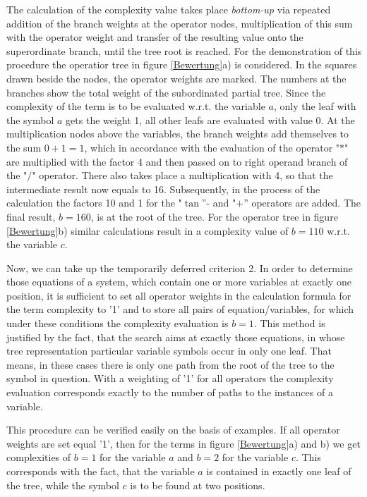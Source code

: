 The calculation of the complexity value takes place {\em bottom-up} via repeated addition of the branch weights at the operator nodes, multiplication of this sum with the operator weight and transfer of the resulting value onto the superordinate branch, until the tree root is reached.
 For the demonstration of this procedure the operatior tree in figure \ref{Bewertung}a) is considered. In the squares drawn beside the nodes, the operator weights are marked. The numbers at the branches show the total weight of the subordinated partial tree. Since the complexity of the term is to be evaluated w.r.t. the variable $a$,
only the leaf with the symbol  $a$ gets the weight 1, all other leafs are evaluated with value 0. At the multiplication nodes above the variables, the branch weights add themselves to the sum $0+1=1$, which in accordance with the evaluation of the operator "$*$" are multiplied with the factor 4 and then passed on to right operand branch of  the "$/$" operator. There also takes place a multiplication with 4, so that the intermediate result  now equals to 16. Subsequently, in the process of the calculation  the factors 10 and 1 for the "$\tan$''- and "$+$'' operators are added. The final result, $b=160$, is at the root of the tree. For the operator tree in figure \ref{Bewertung}b) similar calculations result in a complexity value of $b=110$ w.r.t. the variable $c$.

Now, we can take up the temporarily deferred criterion 2. In order to determine those equations of a system, which contain one or more variables at exactly one position, it is sufficient to set all operator weights  in the calculation formula for the term complexity to '1' and to store all pairs of equation/variables, for which under these conditions the complexity evaluation is $b=1$. This method is justified by the fact, that the search aims at exactly those equations, in whose tree representation particular variable symbols occur in only one leaf. 
That means, in these cases there is only one path from the root of the tree  to the symbol in question. With a weighting of '1' for all operators the complexity evaluation  corresponds exactly to the number of paths to the instances of a variable.

This procedure can be verified easily on the basis of examples. If all operator weights are set equal '1', then  for the terms in figure \ref{Bewertung}a) and b) we get complexities of $b=1$ for the variable $a$ and $b=2$ for the variable $c$. This corresponds with the fact, that the variable $a$ is contained in exactly one leaf of the tree, while the symbol $c$ is to be found at two positions.


